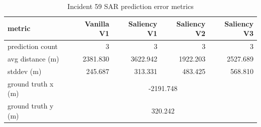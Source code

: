 \begin{table}[ht]
\centering
\caption{Incident 59 SAR prediction error metrics}
\label{tab:sar-incident-59}
\begin{tabular}{lrrrr}
\hline
metric & Vanilla V1 & Saliency V1 & Saliency V2 & Saliency V3 \\
\hline
prediction count & 3 & 3 & 3 & 3 \\
avg distance (m) & 2381.830 & 3622.942 & 1922.203 & 2527.689 \\
stddev (m) & 245.687 & 313.331 & 483.425 & 568.810 \\
ground truth x (m) & \multicolumn{4}{c}{-2191.748} \\
ground truth y (m) & \multicolumn{4}{c}{320.242} \\
\hline
\end{tabular}
\end{table}
